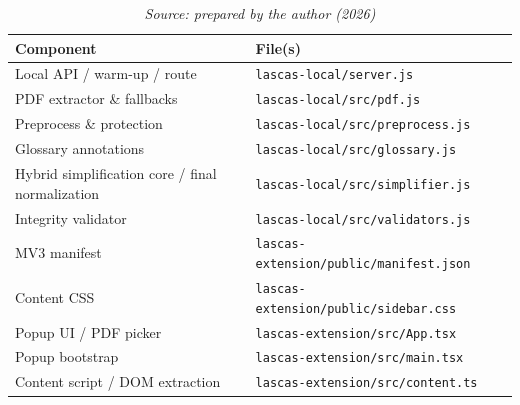 \documentclass[english]{UNISINOSartigo} %
\newcommand{\floatsource}[1]{\caption*{\footnotesize\textit{Source: #1}}}
\newcommand{\tablesource}[1]{\floatsource{#1}}
\begin{document}
\begin{table}[H]\centering
\caption{Component mapping to source files in LASCAS.}
\label{tab:components}
\footnotesize
\setlength{\tabcolsep}{4pt}
\renewcommand{\arraystretch}{1.08}
\begin{tabularx}{\textwidth}{@{}>{\raggedright\arraybackslash}p{4.6cm} >{\raggedright\arraybackslash}X@{}}
\toprule
\textbf{Component} & \textbf{File(s)} \\
\midrule
Local API / warm-up / route & \texttt{lascas-local/server.js} \\
PDF extractor \& fallbacks & \texttt{lascas-local/src/pdf.js} \\
Preprocess \& protection & \texttt{lascas-local/src/preprocess.js} \\
Glossary annotations & \texttt{lascas-local/src/glossary.js} \\
Hybrid simplification core / final normalization & \texttt{lascas-local/src/simplifier.js} \\
Integrity validator & \texttt{lascas-local/src/validators.js} \\
MV3 manifest & \texttt{lascas-extension/public/manifest.json} \\
Content CSS & \texttt{lascas-extension/public/sidebar.css} \\
Popup UI / PDF picker & \texttt{lascas-extension/src/App.tsx} \\
Popup bootstrap & \texttt{lascas-extension/src/main.tsx} \\
Content script / DOM extraction & \texttt{lascas-extension/src/content.ts} \\
\bottomrule
\end{tabularx}
\tablesource{prepared by the author (2026)}
\end{table}
\end{document}
